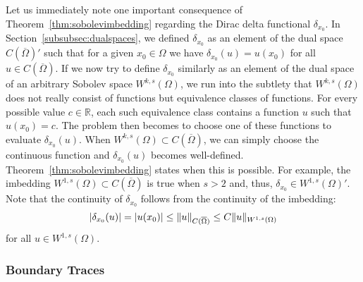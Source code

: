 \documentclass[english, 12pt, a4paper, sci, utf8, a-2b, online]{aaltothesis}
\theoremstyle{definition}
\theoremstyle{plain}
\DeclarePairedDelimiter\abs{\lvert}{\rvert}
\DeclarePairedDelimiter\norm{\lVert}{\rVert}
\numberwithin{equation}{section}
\begin{document}
Let us immediately note one important consequence of 
Theorem~\ref{thm:sobolevimbedding} regarding the Dirac delta functional
$\delta_{x_0}$. In Section~\ref{subsubsec:dualspaces}, we defined $\delta_{x_0}$
as an element of the dual space $C(\overline{\Omega})'$ such that
for a given $x_0 \in \Omega$ we have $\delta_{x_0}(u) = u(x_0)$
for all $u \in C(\overline{\Omega})$.
If we now try to define $\delta_{x_0}$ similarly as an element of the dual space
of an arbitrary Sobolev space $W^{k,s}(\Omega)$, we run into the subtlety
that $W^{k,s}(\Omega)$ does not really consist of functions but equivalence
classes of functions. For every possible value $c \in \mathbb{R}$,
each such equivalence class contains a function $u$ such that $u(x_0) = c$.
The problem then becomes to choose one of these functions to evaluate
$\delta_{x_0}(u)$. When $W^{k,s}(\Omega) \subset C(\overline{\Omega})$,
we can simply choose the continuous function and $\delta_{x_0}(u)$
becomes well-defined. Theorem~\ref{thm:sobolevimbedding} states when this is possible.
For example, the imbedding $W^{1,s}(\Omega) \subset C(\overline{\Omega})$ is true when $s > 2$
and, thus, $\delta_{x_0} \in W^{1,s}(\Omega)'$. Note that the continuity
of $\delta_{x_0}$ follows from the continuity of the imbedding:
\begin{equation*}
    \abs{\delta_{x_0}(u)}
    = \abs{u(x_0)}
    \leq \norm{u}_{C(\overline{\Omega})}
    \leq C \norm{u}_{W^{1,s}(\Omega)}
\end{equation*}
for all $u \in W^{1,s}(\Omega)$.

\subsubsection{Boundary Traces}
\label{subsubsec:boundarytraces}
\end{document}
